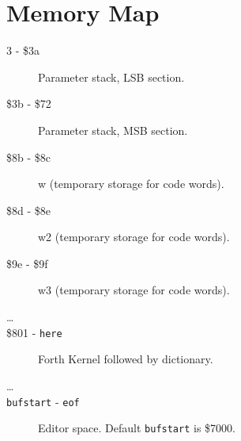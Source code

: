 \chapter{Memory Map}

\begin{description}
\item[3 - \$3a] Parameter stack, LSB section.
\item[\$3b - \$72] Parameter stack, MSB section.
\item[\$8b - \$8c] w (temporary storage for code words).
\item[\$8d - \$8e] w2 (temporary storage for code words).
\item[\$9e - \$9f] w3 (temporary storage for code words).
\item[\ldots]
\item[\$801 - \texttt{here}] Forth Kernel followed by dictionary.
\item[\ldots]
\item[\texttt{bufstart} - \texttt{eof}] Editor space. Default \texttt{bufstart} is \$7000.
\end{description}


